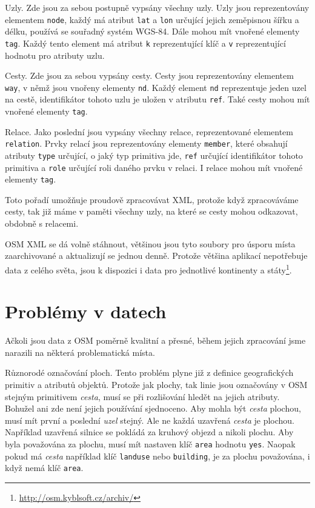 {\tuc Uzly.} Zde jsou za sebou postupně vypsány všechny uzly. Uzly jsou
reprezentovány elementem \verb|node|, každý má atribut \verb|lat| a \verb|lon|
určující jejich zeměpisnou šířku a délku, používá se souřadný systém
WGS-84\cite{wgsnorma}. Dále mohou
mít vnořené elementy \verb|tag|. Každý tento element má atribut \verb|k|
reprezentující klíč a \verb|v| reprezentující hodnotu pro atributy uzlu.

{\tuc Cesty.} Zde jsou za sebou vypsány cesty. Cesty jsou reprezentovány
elementem \verb|way|, v němž jsou vnořeny elementy \verb|nd|. Každý element
\verb|nd| reprezentuje jeden uzel na cestě, identifikátor tohoto uzlu je uložen
v atributu \verb|ref|. Také cesty mohou mít vnořené elementy \verb|tag|.

{\tuc Relace.} Jako poslední jsou vypsány všechny relace, reprezentované
elementem \verb|relation|. Prvky relací jsou reprezentovány elementy
\verb|member|, které obsahují atributy \verb|type| určující, o jaký typ
primitiva jde, \verb|ref| určující identifikátor tohoto primitiva a \verb|role|
určující roli daného prvku v relaci. I relace mohou mít vnořené elementy
\verb|tag|.


Toto pořadí umožňuje proudově zpracovávat XML, protože když zpracováváme cesty,
tak již máme v paměti všechny uzly, na které se cesty mohou odkazovat, obdobně
s relacemi. 

OSM XML se dá volně stáhnout, většinou jsou tyto soubory pro úsporu místa
zaarchivované a aktualizují se jednou denně. Protože většina aplikací
nepotřebuje data z celého světa, jsou k dispozici i data pro jednotlivé
kontinenty a státy\footnote{\url{http://osm.kyblsoft.cz/archiv/}}. 

\section{Problémy v datech}
Ačkoli jsou data z OSM poměrně kvalitní a přesné, během jejich zpracování jsme
narazili na některá problematická místa. 

{\tuc Různorodé označování ploch.} Tento problém plyne již z definice geografických
primitiv a atributů objektů. Protože jak plochy, tak linie jsou označovány v OSM
stejným primitivem {\em cesta}, musí se při rozlišování hledět na jejich atributy.
Bohužel ani zde není jejich používání sjednoceno. Aby mohla být {\em cesta}
plochou, musí mít první a poslední {\em uzel} stejný. Ale ne každá uzavřená {\em
cesta } je plochou. Například uzavřená silnice se pokládá za kruhový objezd a
nikoli plochu. Aby byla považována za plochu, musí mít nastaven klíč
\verb|area| hodnotu \verb|yes|. Naopak pokud má {\em cesta} například klíč \verb|landuse|
nebo \verb|building|, je za plochu považována, i když nemá klíč \verb|area|.

